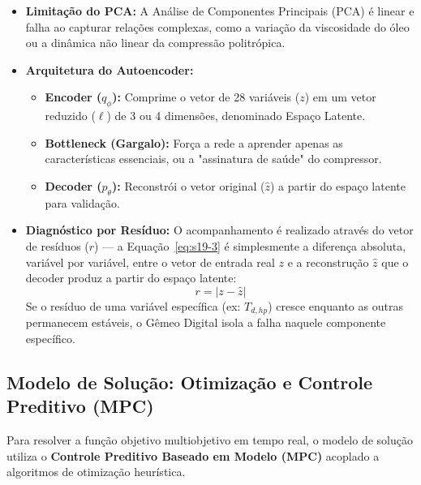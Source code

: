 \documentclass[12pt,a4paper]{article}
\numberwithin{equation}{section}
\numberwithin{table}{section}
\numberwithin{figure}{section}
\begin{document}
\begin{itemize}
	\item \textbf{Limitação do PCA:} A Análise de Componentes Principais (PCA) é linear e falha ao capturar relações complexas, como a variação da viscosidade do óleo ou a dinâmica não linear da compressão politrópica.
	\item \textbf{Arquitetura do Autoencoder:}
	\begin{itemize}
		\item \textbf{Encoder ($q_{\phi}$):} Comprime o vetor de 28 variáveis ($z$) em um vetor reduzido ($\ell$) de 3 ou 4 dimensões, denominado Espaço Latente.
		\item \textbf{Bottleneck (Gargalo):} Força a rede a aprender apenas as características essenciais, ou a "assinatura de saúde" do compressor.
		\item \textbf{Decoder ($p_{\theta}$):} Reconstrói o vetor original ($\hat{z}$) a partir do espaço latente para validação.
	\end{itemize}
	\item \textbf{Diagnóstico por Resíduo:}
	O acompanhamento é realizado através do vetor de resíduos ($r$) — a Equação~\eqref{eq:s19-3} é simplesmente a diferença absoluta, variável por variável, entre o vetor de entrada real $z$ e a reconstrução $\hat{z}$ que o decoder produz a partir do espaço latente:
	\begin{equation}\label{eq:s19-3}
 r = | z - \hat{z} |
\end{equation}
	Se o resíduo de uma variável específica (ex: $T_{d,hp}$) cresce enquanto as outras permanecem estáveis, o Gêmeo Digital isola a falha naquele componente específico.
\end{itemize}

\subsection{Modelo de Solução: Otimização e Controle Preditivo (MPC)}

Para resolver a função objetivo multiobjetivo em tempo real, o modelo de solução utiliza o \textbf{Controle Preditivo Baseado em Modelo (MPC)} acoplado a algoritmos de otimização heurística.
\end{document}
